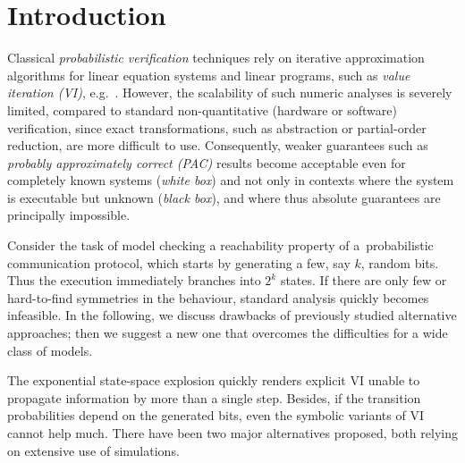 \section{Introduction}

Classical \emph{probabilistic verification} techniques rely on iterative approximation algorithms for linear equation systems and linear programs, such as \emph{value iteration (VI)}, e.g.\  \cite{Puterman}.
However, the scalability of such numeric analyses is severely limited, compared to standard non-quantitative (hardware or software) verification, since exact transformations, such as abstraction or partial-order reduction, are more difficult to use.
Consequently, weaker guarantees such as \emph{probably approximately correct (PAC)} results become acceptable even for completely known systems (\emph{white box}) and not only in contexts where the system is executable but unknown (\emph{black box}), and where thus absolute guarantees are principally impossible.

\begin{example}
	Consider the task of model checking a reachability property of a~probabilistic communication protocol, which starts by generating a few, say $k$, random bits.
	Thus the execution immediately branches into $2^k$ states.
	If there are only few or hard-to-find symmetries in the behaviour, standard analysis quickly becomes infeasible. 
	In the following, we discuss drawbacks of previously studied alternative approaches; then we suggest a new one that overcomes the difficulties for a wide class of models.
\end{example}


The exponential state-space explosion quickly renders explicit VI unable to propagate information by more than a single step.
Besides, if the transition probabilities depend on the generated bits, even the symbolic variants of VI \cite{DBLP:conf/icalp/BaierCHKR97} cannot help much.
There have been two major alternatives proposed, both relying on extensive use of simulations.


